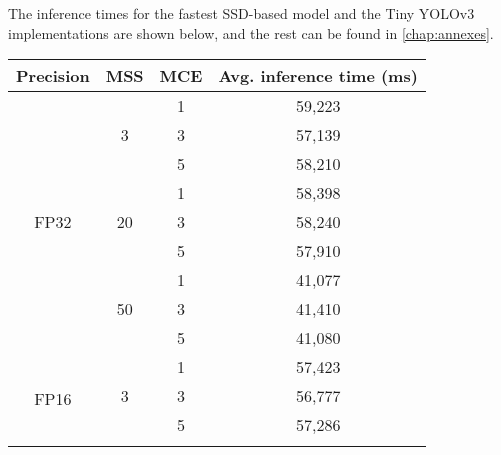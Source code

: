 The inference times for the fastest SSD-based model and the Tiny YOLOv3 implementations are shown below, and the rest can be found in \autoref{chap:annexes}.


\begin{table}[]
	\begin{tabular}{cccc}
		\hline
		\multicolumn{1}{|c|}{\textbf{Precision}}    & \multicolumn{1}{c|}{\textbf{MSS}}        & \multicolumn{1}{c|}{\textbf{MCE}} & \multicolumn{1}{c|}{\textbf{Avg. inference time (ms)}} \\ \hline
		\multicolumn{1}{|c|}{\multirow{9}{*}{FP32}} & \multicolumn{1}{c|}{\multirow{3}{*}{3}}  & \multicolumn{1}{c|}{1}  & \multicolumn{1}{c|}{59,223}    \\ \cline{3-4} 
		\multicolumn{1}{|c|}{}   & \multicolumn{1}{c|}{}          & \multicolumn{1}{c|}{3}  & \multicolumn{1}{c|}{57,139}    \\ \cline{3-4} 
		\multicolumn{1}{|c|}{}   & \multicolumn{1}{c|}{}          & \multicolumn{1}{c|}{5}  & \multicolumn{1}{c|}{58,210}    \\ \cline{2-4} 
		\multicolumn{1}{|c|}{}   & \multicolumn{1}{c|}{\multirow{3}{*}{20}} & \multicolumn{1}{c|}{1}  & \multicolumn{1}{c|}{58,398}    \\ \cline{3-4} 
		\multicolumn{1}{|c|}{}   & \multicolumn{1}{c|}{}          & \multicolumn{1}{c|}{3}  & \multicolumn{1}{c|}{58,240}    \\ \cline{3-4} 
		\multicolumn{1}{|c|}{}   & \multicolumn{1}{c|}{}          & \multicolumn{1}{c|}{5}  & \multicolumn{1}{c|}{57,910}    \\ \cline{2-4} 
		\multicolumn{1}{|c|}{}   & \multicolumn{1}{c|}{\multirow{3}{*}{50}} & \multicolumn{1}{c|}{1}  & \multicolumn{1}{c|}{41,077}    \\ \cline{3-4} 
		\multicolumn{1}{|c|}{}   & \multicolumn{1}{c|}{}          & \multicolumn{1}{c|}{3}  & \multicolumn{1}{c|}{41,410}    \\ \cline{3-4} 
		\multicolumn{1}{|c|}{}   & \multicolumn{1}{c|}{}          & \multicolumn{1}{c|}{5}  & \multicolumn{1}{c|}{41,080}    \\ \hline
		\multicolumn{1}{|c|}{\multirow{9}{*}{FP16}} & \multicolumn{1}{c|}{\multirow{3}{*}{3}}  & \multicolumn{1}{c|}{1}  & \multicolumn{1}{c|}{57,423}    \\ \cline{3-4} 
		\multicolumn{1}{|c|}{}   & \multicolumn{1}{c|}{}          & \multicolumn{1}{c|}{3}  & \multicolumn{1}{c|}{56,777}    \\ \cline{3-4} 
		\multicolumn{1}{|c|}{}   & \multicolumn{1}{c|}{}          & \multicolumn{1}{c|}{5}  & \multicolumn{1}{c|}{57,286}    \\ \cline{2-4} 

\end{tabular}
\end{table}
